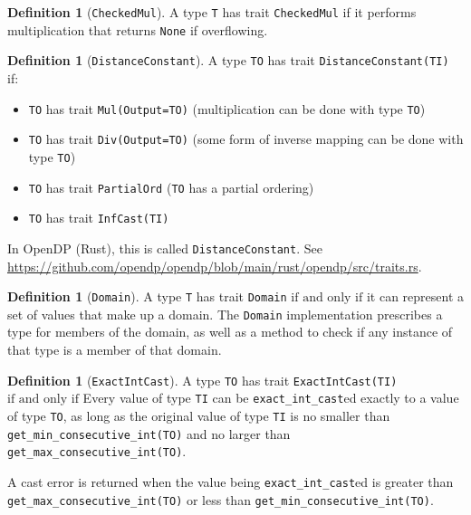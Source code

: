\documentclass[11pt,a4paper]{article}
\theoremstyle{definition}
\newtheorem{definition}[theorem]{Definition}
\newcommand{\inOpenDPRust}[2]{In OpenDP (Rust), this is called \texttt{#1}. See \url{#2}.}
\newcommand{\iffText}{\text{if and only if}}
\begin{document}
\begin{definition}[\texttt{CheckedMul}]
    A type \texttt{T} has trait \texttt{CheckedMul} if it performs multiplication that returns \texttt{None} if overflowing.
\end{definition}

\begin{definition}[\texttt{DistanceConstant}]
    A type \texttt{TO} has trait \texttt{DistanceConstant(TI)} if:
    \begin{itemize}
        \item \texttt{TO} has trait \texttt{Mul(Output=TO)} (multiplication can be done with type \texttt{TO})
        \item \texttt{TO} has trait \texttt{Div(Output=TO)} (some form of inverse mapping can be done with type \texttt{TO})
        \item \texttt{TO} has trait \texttt{PartialOrd} (\texttt{TO} has a partial ordering)
        \item \texttt{TO} has trait \texttt{InfCast(TI)}
    \end{itemize}
    
    \inOpenDPRust{DistanceConstant}{https://github.com/opendp/opendp/blob/main/rust/opendp/src/traits.rs}
\end{definition}

\begin{definition}[\texttt{Domain}]
\label{defn:traits-domain}
A type \texttt{T} has trait \texttt{Domain} $\iffText$ it can represent a set of values that make up a domain. The \texttt{Domain} implementation prescribes a type for members of the domain, as well as a method to check if any instance of that type is a member of that domain.
\end{definition}

\begin{definition}[\texttt{ExactIntCast}]
    A type \texttt{TO} has trait \texttt{ExactIntCast(TI)} $\iffText$ Every value of type \texttt{TI} can be \texttt{exact\_int\_cast}ed exactly to a value of type \texttt{TO}, as long as the original value of type \texttt{TI} is no smaller than \texttt{get\_min\_consecutive\_int(TO)} and no larger than \texttt{get\_max\_consecutive\_int(TO)}.
    
    A cast error is returned when the value being \texttt{exact\_int\_cast}ed is greater than \texttt{get\_max\_consecutive\_int(TO)} or less than \texttt{get\_min\_consecutive\_int(TO)}.
\end{definition}
\end{document}
